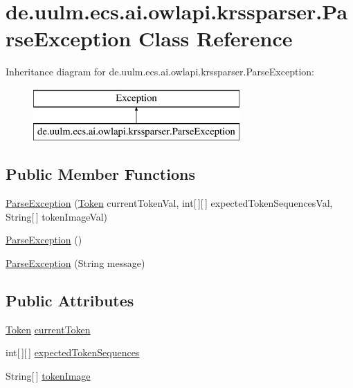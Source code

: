 \hypertarget{classde_1_1uulm_1_1ecs_1_1ai_1_1owlapi_1_1krssparser_1_1_parse_exception}{\section{de.\-uulm.\-ecs.\-ai.\-owlapi.\-krssparser.\-Parse\-Exception Class Reference}
\label{classde_1_1uulm_1_1ecs_1_1ai_1_1owlapi_1_1krssparser_1_1_parse_exception}
}
Inheritance diagram for de.\-uulm.\-ecs.\-ai.\-owlapi.\-krssparser.\-Parse\-Exception\-:\begin{figure}[H]
\begin{center}
\leavevmode
\includegraphics[height=2.000000cm]{classde_1_1uulm_1_1ecs_1_1ai_1_1owlapi_1_1krssparser_1_1_parse_exception}
\end{center}
\end{figure}
\subsection*{Public Member Functions}
\begin{DoxyCompactItemize}
\item 
\hyperlink{classde_1_1uulm_1_1ecs_1_1ai_1_1owlapi_1_1krssparser_1_1_parse_exception_aeed69947460b32811297b988fc6fb27f}{Parse\-Exception} (\hyperlink{classde_1_1uulm_1_1ecs_1_1ai_1_1owlapi_1_1krssparser_1_1_token}{Token} current\-Token\-Val, int\mbox{[}$\,$\mbox{]}\mbox{[}$\,$\mbox{]} expected\-Token\-Sequences\-Val, String\mbox{[}$\,$\mbox{]} token\-Image\-Val)
\item 
\hyperlink{classde_1_1uulm_1_1ecs_1_1ai_1_1owlapi_1_1krssparser_1_1_parse_exception_acdba0993ebc4b96135fa0e0758495680}{Parse\-Exception} ()
\item 
\hyperlink{classde_1_1uulm_1_1ecs_1_1ai_1_1owlapi_1_1krssparser_1_1_parse_exception_a5db9ed1337adcebf26639612627fba74}{Parse\-Exception} (String message)
\end{DoxyCompactItemize}
\subsection*{Public Attributes}
\begin{DoxyCompactItemize}
\item 
\hyperlink{classde_1_1uulm_1_1ecs_1_1ai_1_1owlapi_1_1krssparser_1_1_token}{Token} \hyperlink{classde_1_1uulm_1_1ecs_1_1ai_1_1owlapi_1_1krssparser_1_1_parse_exception_a8e87575c92870b9a4d13e7fa62a49664}{current\-Token}
\item 
int\mbox{[}$\,$\mbox{]}\mbox{[}$\,$\mbox{]} \hyperlink{classde_1_1uulm_1_1ecs_1_1ai_1_1owlapi_1_1krssparser_1_1_parse_exception_a0bd006134d3ed9aba2fca16a4865924d}{expected\-Token\-Sequences}
\item 
String\mbox{[}$\,$\mbox{]} \hyperlink{classde_1_1uulm_1_1ecs_1_1ai_1_1owlapi_1_1krssparser_1_1_parse_exception_aaf056082fde061be2e426b3e3ecb86ee}{token\-Image}
\end{DoxyCompactItemize}
